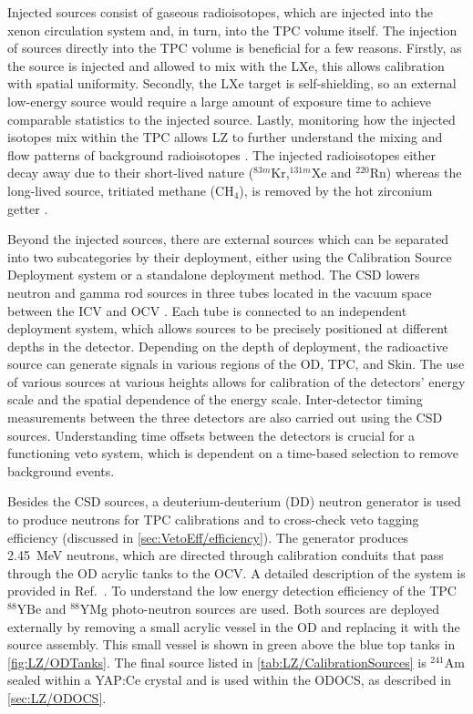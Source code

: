 Injected sources consist of gaseous radioisotopes, which are injected into the xenon circulation system and, in turn, into the TPC volume itself. The injection of sources directly into the TPC volume is beneficial for a few reasons. Firstly, as the source is injected and allowed to mix with the LXe, this allows calibration with spatial uniformity. Secondly, the LXe target is self-shielding, so an external low-energy source would require a large amount of exposure time to achieve comparable statistics to the injected source. Lastly, monitoring how the injected isotopes mix within the TPC allows LZ to further understand the mixing and flow patterns of background radioisotopes \cite{LZ:2024bsz}. The injected radioisotopes either decay away due to their short-lived nature ($^{83m}\text{Kr}$,$^{131m}\text{Xe}$ and $^{220}\text{Rn}$) whereas the long-lived source, tritiated methane ($\text{CH}_4$), is removed by the hot zirconium getter \cite{LZNIMA}.

Beyond the injected sources, there are external sources which can be separated into two subcategories by their deployment, either using the Calibration Source Deployment system or a standalone deployment method. The CSD lowers neutron and gamma rod sources in three tubes located in the vacuum space between the ICV and OCV \cite{LZNIMA}. Each tube is connected to an independent deployment system, which allows sources to be precisely positioned at different depths in the detector. Depending on the depth of deployment, the radioactive source can generate signals in various regions of the OD, TPC, and Skin. The use of various sources at various heights allows for calibration of the detectors' energy scale and the spatial dependence of the energy scale. Inter-detector timing measurements between the three detectors are also carried out using the CSD sources. Understanding time offsets between the detectors is crucial for a functioning veto system, which is dependent on a time-based selection to remove background events.

Besides the CSD sources, a deuterium-deuterium (DD) neutron generator is used to produce neutrons for TPC calibrations and to cross-check veto tagging efficiency (discussed in \autoref{sec:VetoEff/efficiency}). The generator produces 2.45~MeV neutrons, which are directed through calibration conduits that pass through the OD acrylic tanks to the OCV. A detailed description of the system is provided in Ref.~\cite{LZ:2024bsz}. To understand the low energy detection efficiency of the TPC $^{88}\text{YBe}$ and $^{88}\text{YMg}$ photo-neutron sources are used. Both sources are deployed externally by removing a small acrylic vessel in the OD and replacing it with the source assembly. This small vessel is shown in green above the blue top tanks in  \autoref{fig:LZ/ODTanks}.
The final source listed in \autoref{tab:LZ/CalibrationSources} is $^{241}\text{Am}$ sealed within a YAP:Ce crystal and is used within the ODOCS, as described in \autoref{sec:LZ/ODOCS}.

